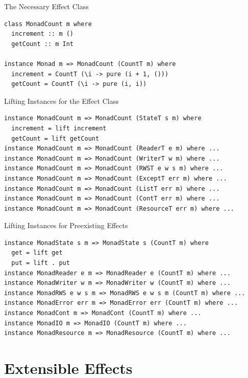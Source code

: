 \documentclass[aspectratio=169]{beamer}
\begin{document}
\begin{frame}[fragile]{The Necessary Effect Class}
  \begin{lstlisting}
class MonadCount m where
  increment :: m ()
  getCount :: m Int

instance Monad m => MonadCount (CountT m) where
  increment = CountT (\i -> pure (i + 1, ()))
  getCount = CountT (\i -> pure (i, i))
  \end{lstlisting}
\end{frame}

\begin{frame}[fragile]{Lifting Instances for the Effect Class}
\begin{lstlisting}
instance MonadCount m => MonadCount (StateT s m) where
  increment = lift increment
  getCount = lift getCount
instance MonadCount m => MonadCount (ReaderT e m) where ...
instance MonadCount m => MonadCount (WriterT w m) where ...
instance MonadCount m => MonadCount (RWST e w s m) where ...
instance MonadCount m => MonadCount (ExceptT err m) where ...
instance MonadCount m => MonadCount (ListT err m) where ...
instance MonadCount m => MonadCount (ContT err m) where ...
instance MonadCount m => MonadCount (ResourceT err m) where ...
  \end{lstlisting}
\end{frame}

\begin{frame}[fragile]{Lifting Instances for Preexisting Effects}
  \begin{lstlisting}
instance MonadState s m => MonadState s (CountT m) where
  get = lift get
  put = lift . put
instance MonadReader e m => MonadReader e (CountT m) where ...
instance MonadWriter w m => MonadWriter w (CountT m) where ...
instance MonadRWS e w s m => MonadRWS e w s m (CountT m) where ...
instance MonadError err m => MonadError err (CountT m) where ...
instance MonadCont m => MonadCont (CountT m) where ...
instance MonadIO m => MonadIO (CountT m) where ...
instance MonadResource m => MonadResource (CountT m) where ...
  \end{lstlisting}
\end{frame}


\section{Extensible Effects}
\end{document}
